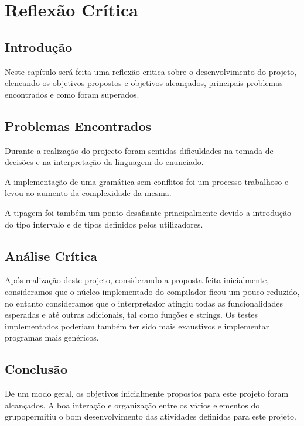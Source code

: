 \section{Reflexão Crítica}
\label{sec3:imp-test}

\subsection{Introdução}
\label{sec3:subsec:intro}
Neste capítulo será feita uma reflexão critica sobre o desenvolvimento do projeto, elencando  os  objetivos  propostos  e  objetivos  alcançados,  principais  problemas encontrados e como foram superados.

\subsection{Problemas Encontrados}
\label{sec3:subsec:problems}

Durante a realização do projecto foram sentidas dificuldades na tomada de decisões e na interpretação da linguagem do enunciado.

A implementação de uma gramática sem conflitos foi um processo trabalhoso e levou ao aumento da complexidade da mesma.

A tipagem foi também um ponto desafiante principalmente devido a introdução do tipo intervalo e de tipos definidos pelos utilizadores.

\subsection{Análise Crítica}
\label{sec3:subsec:review}

Após realização deste projeto, considerando a proposta feita inicialmente, consideramos que o núcleo implementado do compilador ficou um pouco reduzido, no entanto consideramos que o interpretador atingiu todas as funcionalidades esperadas e até outras adicionais, tal como funções e strings. Os testes implementados poderiam também ter sido mais exaustivos e implementar programas mais genéricos.

\subsection{Conclusão}
\label{sec3:subsec:outro}
De um modo geral, os objetivos inicialmente propostos para este projeto foram alcançados.  A boa interação e organização entre os vários elementos do grupopermitiu o bom desenvolvimento das atividades definidas para este projeto.
